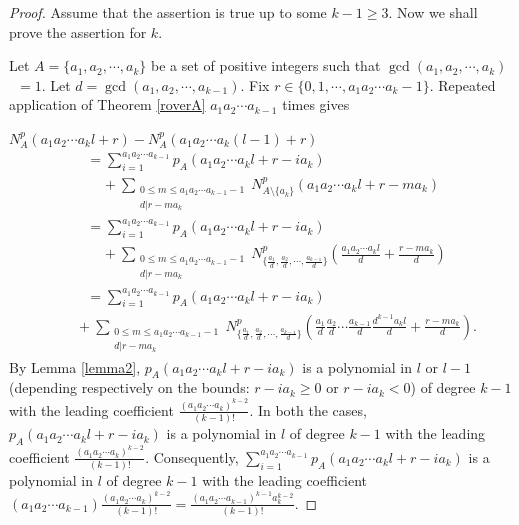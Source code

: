 \documentclass[10pt,a4paper]{amsart}
\begin{document}
\begin{proof}
Assume that the assertion is true up to some $k-1\geq 3$. Now we shall prove the assertion for $k$. 

Let $A=\{a_1,a_2,\cdots ,a_k\}$ be a set of positive integers such that $\gcd(a_1,a_2,\cdots ,a_k)$\ $=1$. Let $d=\gcd(a_1,a_2,\cdots ,a_{k-1})$. Fix $r\in\{0,1,\cdots ,a_1a_2\cdots a_k-1\}$. Repeated application of Theorem \ref{roverA} $a_1a_2\cdots a_{k-1}$ times gives

$N_A^p(a_1a_2\cdots a_kl+r)-N_A^p(a_1a_2\cdots a_k(l-1)+r)$
\begin{align*}
&=\sum_{i=1}^{a_1a_2\cdots a_{k-1}}p_A(a_1a_2\cdots a_kl+r-ia_k)\\ &\ \ \ \ \ +\sum_{\substack{0\leq m\leq a_1a_2\cdots a_{k-1}-1\\ d|r-ma_k}}N_{A\setminus\{a_k\}}^p(a_1a_2\cdots a_kl+r-ma_k)\\
&=\sum_{i=1}^{a_1a_2\cdots a_{k-1}}p_A(a_1a_2\cdots a_kl+r-ia_k)\\ &\ \ \ \ \ +\sum_{\substack{0\leq m\leq a_1a_2\cdots a_{k-1}-1\\ d|r-ma_k}}N_{\{\frac{a_1}{d},\frac{a_2}{d},\cdots ,\frac{a_{k-1}}{d}\}}^p\left(\frac{a_1a_2\cdots a_kl}{d}+\frac{r-ma_k}{d}\right)\\
&=\sum_{i=1}^{a_1a_2\cdots a_{k-1}}p_A(a_1a_2\cdots a_kl+r-ia_k)
\end{align*}
\begin{align}\label{eqn2}
\ \ \ \ \ \ \ \ \ \  +\sum_{\substack{0\leq m\leq a_1a_2\cdots a_{k-1}-1\\ d|r-ma_k}}N_{\{\frac{a_1}{d},\frac{a_2}{d},\cdots ,\frac{a_{k-1}}{d}\}}^p\left(\frac{a_1}{d}\frac{a_2}{d}\cdots \frac{a_{k-1}}{d}\frac{d^{k-1}a_kl}{d}+\frac{r-ma_k}{d}\right).
\end{align}
By Lemma \ref{lemma2}, $p_A(a_1a_2\cdots a_kl+r-ia_k)$ is a polynomial in $l$ or $l-1$ (depending respectively on the bounds: $r-ia_k\geq 0$ or $r-ia_k<0$) of degree $k-1$ with the leading coefficient $\frac{(a_1a_2\cdots a_k)^{k-2}}{(k-1)!}$. In both the cases, $p_A(a_1a_2\cdots a_kl+r-ia_k)$ is  a polynomial in $l$ of degree $k-1$ with the leading coefficient $\frac{(a_1a_2\cdots a_k)^{k-2}}{(k-1)!}$. Consequently, $\sum_{i=1}^{a_1a_2\cdots a_{k-1}}p_A(a_1a_2\cdots a_kl+r-ia_k)$ is a polynomial in $l$ of degree $k-1$ with the leading coefficient $(a_1a_2\cdots a_{k-1})\frac{(a_1a_2\cdots a_k)^{k-2}}{(k-1)!}=\frac{(a_1a_2\cdots a_{k-1})^{k-1}a_k^{k-2}}{(k-1)!}$.


\end{proof}
\end{document}
